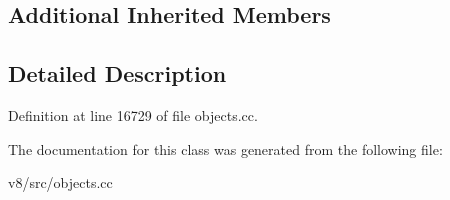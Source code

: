 \subsection*{Additional Inherited Members}


\subsection{Detailed Description}


Definition at line 16729 of file objects.\+cc.



The documentation for this class was generated from the following file\+:\begin{DoxyCompactItemize}
\item 
v8/src/objects.\+cc\end{DoxyCompactItemize}
